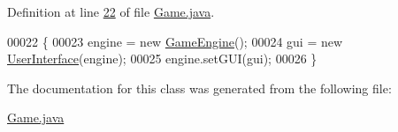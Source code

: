Definition at line \hyperlink{Game_8java_source_l00022}{22} of file \hyperlink{Game_8java_source}{Game.\-java}.


\begin{DoxyCode}
00022                    \{
00023         engine = \textcolor{keyword}{new} \hyperlink{classGameEngine}{GameEngine}();
00024         gui = \textcolor{keyword}{new} \hyperlink{classUserInterface}{UserInterface}(engine);
00025         engine.setGUI(gui);
00026     \}
\end{DoxyCode}


The documentation for this class was generated from the following file\-:\begin{DoxyCompactItemize}
\item 
\hyperlink{Game_8java}{Game.\-java}\end{DoxyCompactItemize}
